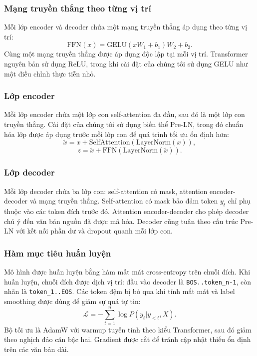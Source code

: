 \documentclass[conference]{IEEEtran}
\begin{document}
\subsubsection{Mạng truyền thẳng theo từng vị trí}
Mỗi lớp encoder và decoder chứa một mạng truyền thẳng áp dụng theo từng vị trí:
\begin{equation}
\mathrm{FFN}(x) = \mathrm{GELU}(xW_1 + b_1)W_2 + b_2.
\end{equation}
Cùng một mạng truyền thẳng được áp dụng độc lập tại mỗi vị trí. Transformer nguyên bản sử dụng ReLU, trong khi cài đặt của chúng tôi sử dụng GELU như một điều chỉnh thực tiễn nhỏ.

\subsubsection{Lớp encoder}
Mỗi lớp encoder chứa một lớp con self-attention đa đầu, sau đó là một lớp con truyền thẳng. Cài đặt của chúng tôi sử dụng biến thể Pre-LN, trong đó chuẩn hóa lớp được áp dụng trước mỗi lớp con để quá trình tối ưu ổn định hơn:
\begin{equation}
\tilde{x} = x + \mathrm{SelfAttention}(\mathrm{LayerNorm}(x)),
\end{equation}
\begin{equation}
z = \tilde{x} + \mathrm{FFN}(\mathrm{LayerNorm}(\tilde{x})).
\end{equation}

\subsubsection{Lớp decoder}
Mỗi lớp decoder chứa ba lớp con: self-attention có mask, attention encoder-decoder và mạng truyền thẳng. Self-attention có mask bảo đảm token $y_t$ chỉ phụ thuộc vào các token đích trước đó. Attention encoder-decoder cho phép decoder chú ý đến văn bản nguồn đã được mã hóa. Decoder cũng tuân theo cấu trúc Pre-LN với kết nối phần dư và dropout quanh mỗi lớp con.

\subsubsection{Hàm mục tiêu huấn luyện}
Mô hình được huấn luyện bằng hàm mất mát cross-entropy trên chuỗi đích. Khi huấn luyện, chuỗi đích được dịch vị trí: đầu vào decoder là \texttt{BOS..token\_n-1}, còn nhãn là \texttt{token\_1..EOS}. Các token đệm bị bỏ qua khi tính mất mát và label smoothing được dùng để giảm sự quá tự tin:
\begin{equation}
\mathcal{L} = -\sum_{t=1}^{n} \log P(y_t | y_{<t}, X).
\end{equation}
Bộ tối ưu là AdamW với warmup tuyến tính theo kiểu Transformer, sau đó giảm theo nghịch đảo căn bậc hai. Gradient được cắt để tránh cập nhật thiếu ổn định trên các văn bản dài.
\end{document}
